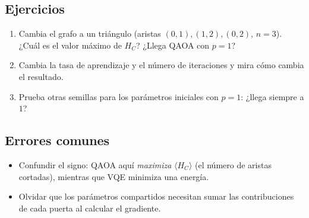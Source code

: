 \subsection{Ejercicios}
\begin{enumerate}
  \item Cambia el grafo a un triángulo (aristas $(0,1),(1,2),(0,2)$, $n=3$).
    ¿Cuál es el valor máximo de $H_C$? ¿Llega QAOA con $p=1$?
  \item Cambia la tasa de aprendizaje y el número de iteraciones y mira cómo
    cambia el resultado.
  \item Prueba otras semillas para los parámetros iniciales con $p=1$: ¿llega
    siempre a $1$?
\end{enumerate}

\subsection{Errores comunes}
\begin{itemize}
  \item Confundir el signo: QAOA aquí \emph{maximiza} $\langle H_C\rangle$ (el
    número de aristas cortadas), mientras que VQE minimiza una energía.
  \item Olvidar que los parámetros compartidos necesitan sumar las
    contribuciones de cada puerta al calcular el gradiente.
\end{itemize}


